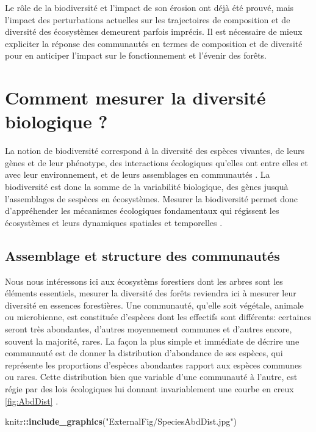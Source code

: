 \documentclass[
  11pt,
  french,
  A4paper,
  extrafontsizes,onecolumn,openright
  ]{memoir}
\newenvironment{Shaded}{\begin{snugshade}}{\end{snugshade}}
\newcommand{\KeywordTok}[1]{\textcolor[rgb]{0.13,0.29,0.53}{\textbf{#1}}}
\newcommand{\StringTok}[1]{\textcolor[rgb]{0.31,0.60,0.02}{#1}}
\newcommand{\OperatorTok}[1]{\textcolor[rgb]{0.81,0.36,0.00}{\textbf{#1}}}
\newcommand{\NormalTok}[1]{#1}
\begin{document}
Le rôle de la biodiversité et l'impact de son érosion ont déjà été
prouvé, mais l'impact des perturbations actuelles sur les trajectoires
de composition et de diversité des écosystèmes demeurent parfois
imprécis. Il est nécessaire de mieux expliciter la réponse des
communautés en termes de composition et de diversité pour en anticiper
l'impact sur le fonctionnement et l'évenir des forêts.

\section{Comment mesurer la diversité biologique
?}\label{comment-mesurer-la-diversite-biologique}

La notion de biodiversité correspond à la diversité des espèces
vivantes, de leurs gènes et de leur phénotype, des interactions
écologiques qu'elles ont entre elles et avec leur environnement, et de
leurs assemblages en communautés \autocite{Loreau2005}. La biodiversité
est donc la somme de la variabilité biologique, des gènes jusquà
l'assemblages de sespèces en écosystèmes. Mesurer la biodiversité permet
donc d'appréhender les mécanismes écologiques fondamentaux qui régissent
les écosystèmes et leurs dynamiques spatiales et temporelles
\autocites{Purvis2000}{Loreau2005}.

\subsection{Assemblage et structure des
communautés}\label{AbundanceDistribution}

Nous nous intéressons ici aux écosystèms forestiers dont les arbres sont
les éléments essentiels, mesurer la diversité des forêts reviendra ici à
mesurer leur diversité en essences forestières. Une communauté, qu'elle
soit végétale, animale ou microbienne, est constituée d'espèces dont les
effectifs sont différents: certaines seront très abondantes, d'autres
moyennement communes et d'autres encore, souvent la majorité, rares. La
façon la plus simple et immédiate de décrire une communauté est de
donner la distribution d'abondance de ses espèces, qui représente les
proportions d'espèces abondantes rapport aux espèces communes ou rares.
Cette distribution bien que variable d'une communauté à l'autre, est
régie par des lois écologiques lui donnant invariablement une courbe en
creux \ref{fig:AbdDist} \autocite{McGill2007}.

\begin{Shaded}
\begin{Highlighting}[]
\NormalTok{knitr}\OperatorTok{::}\KeywordTok{include_graphics}\NormalTok{(}\StringTok{"ExternalFig/SpeciesAbdDist.jpg"}\NormalTok{)}
\end{Highlighting}
\end{Shaded}
\end{document}
